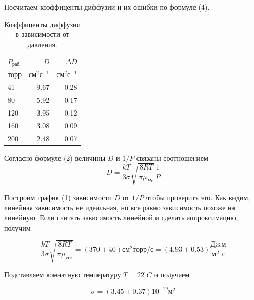 \documentclass{article}
\begin{document}
    Посчитаем коэффиценты диффузии и их ошибки по формуле (4).

    \begin{table}[h!]
        \vspace{5pt}
        \begin{center}
        \begin{tabular}{|l|rr|}
        \hline
        $P_{раб}$ & $D$ & $\Delta D$ \\
        торр & $см^2с^{-1}$ & $см^2с^{-1}$\\
        \hline
        41 & 9.67 & 0.28 \\
        80 & 5.92 & 0.17 \\
        120 & 3.95 & 0.12 \\
        160 & 3.08 & 0.09 \\
        200 & 2.48 & 0.07 \\
        \hline
        \end{tabular}

        \caption{Коэффиценты диффузии в зависимости от давления.}
        \label{data}
        \end{center}
    \end{table}

    Согласно формуле (2) величины $D$ и $1/P$ связаны соотношением
    \begin{equation}
    D = \frac{kT}{3\sigma} \sqrt{\frac{8RT}{\pi \mu_{He}}}  \frac{1}{P}
    \end{equation}

    Построим график (1) зависимости $D$ от $1/P$ чтобы проверить это. Как видим, линейная зависимость не идеальная, но все равно зависимость похоже на линейную. Если считать зависимость линейной и сделать аппроксимацию, получим

    \begin{equation}
        \frac{kT}{3\sigma} \sqrt{\frac{8RT}{\pi \mu_{He}}} = (370 \pm 40) см^2торр/с = (4.93 \pm 0.53)\frac{Дж}{м^2}\frac{м}{с}
    \end{equation}

    Подставляем комнатную температуру $T = 22 ^\circ C$ и получаем

    \begin{equation}
        \sigma = (3.45 \pm 0.37) 10^{-19}м^2
    \end{equation}
\end{document}
